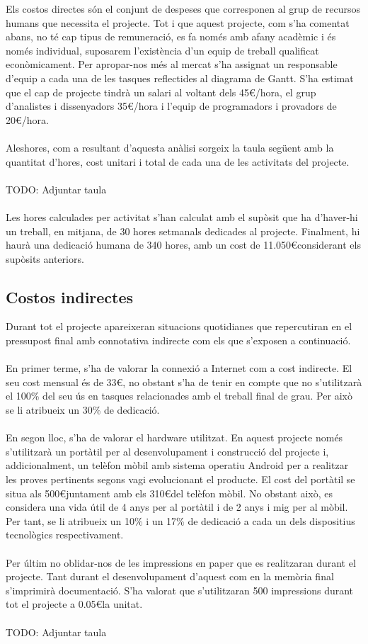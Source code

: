 Els costos directes són el conjunt de despeses que corresponen al grup de recursos humans que necessita el projecte. Tot i que aquest projecte, com s’ha comentat abans, no té cap tipus de remuneració, es fa només amb afany acadèmic i és només individual, suposarem l’existència d’un equip de treball qualificat econòmicament. Per apropar-nos més al mercat s’ha assignat un responsable d’equip a cada una de les tasques reflectides al diagrama de Gantt. S’ha estimat que el cap de projecte tindrà un salari al voltant dels 45\euro/hora, el grup d’analistes i dissenyadors 35\euro/hora i l’equip de programadors i provadors de 20\euro/hora.
\\\\
Aleshores, com a resultant d’aquesta anàlisi sorgeix la taula següent amb la quantitat d’hores, cost unitari i total de cada una de les activitats del projecte.
\\\\
TODO: Adjuntar taula
\\\\
Les hores calculades per activitat s’han calculat amb el supòsit que ha d’haver-hi un treball, en mitjana, de 30 hores setmanals dedicades al projecte. Finalment, hi haurà una dedicació humana de 340 hores, amb un cost de 11.050\euro\space considerant els supòsits anteriors.

\subsection{Costos indirectes}

Durant tot el projecte apareixeran situacions quotidianes que repercutiran en el pressupost final amb connotativa indirecte com els que s’exposen a continuació.
\\\\
En primer terme, s’ha de valorar la connexió a Internet com a cost indirecte. El seu cost mensual és de 33\euro, no obstant s’ha de tenir en compte que no s’utilitzarà el 100\% del seu ús en tasques relacionades amb el treball final de grau. Per això se li atribueix un 30\% de dedicació.
\\\\
En segon lloc, s’ha de valorar el hardware utilitzat. En aquest projecte només s’utilitzarà un portàtil per al desenvolupament i construcció del projecte i, addicionalment, un telèfon mòbil amb sistema operatiu Android per a realitzar les proves pertinents segons vagi evolucionant el producte. El cost del portàtil se situa als 500\euro\space juntament amb els 310\euro\space del telèfon mòbil. No obstant això, es considera una vida útil de 4 anys per al portàtil i de 2 anys i mig per al mòbil. Per tant, se li atribueix un 10\% i un 17\% de dedicació a cada un dels dispositius tecnològics respectivament.
\\\\
Per últim no oblidar-nos de les impressions en paper que es realitzaran durant el projecte. Tant durant el desenvolupament d’aquest com en la memòria final s’imprimirà documentació. S’ha valorat que s’utilitzaran 500 impressions durant tot el projecte a 0.05\euro\space la unitat.
\\\\
TODO: Adjuntar taula


